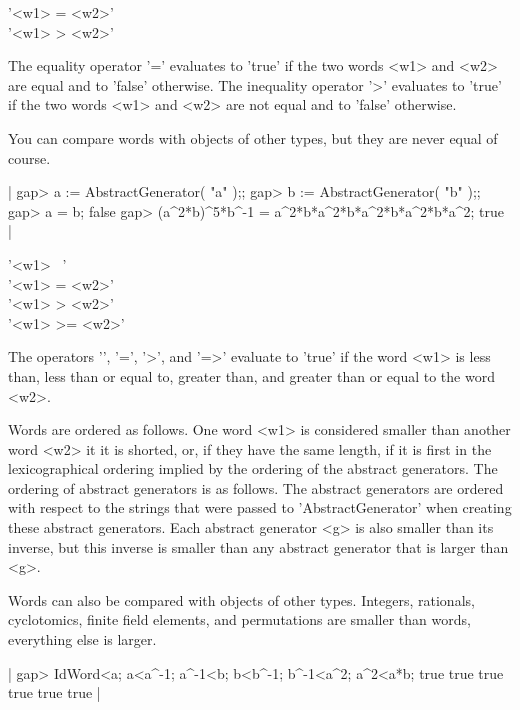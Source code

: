
'<w1> = <w2>'\\
'<w1> \<> <w2>'

The equality operator '=' evaluates to 'true' if the  two words  <w1> and
<w2> are equal and  to  'false' otherwise.  The inequality operator '\<>'
evaluates to 'true'  if the two words <w1> and <w2> are not  equal and to
'false' otherwise.

You  can  compare words  with objects of  other types, but they are never
equal of course.

|    gap> a := AbstractGenerator( "a" );;
    gap> b := AbstractGenerator( "b" );;
    gap> a = b;
    false
    gap> (a^2*b)^5*b^-1 = a^2*b*a^2*b*a^2*b*a^2*b*a^2;
    true |

'<w1> \<\ <w2>' \\
'<w1> \<= <w2>' \\
'<w1>  >  <w2>' \\
'<w1>  >= <w2>'

The operators '\<', '\<=', '>', and  '=>' evaluate to 'true'  if the word
<w1> is less than, less than or equal to, greater than, and greater  than
or equal to the word <w2>.

Words are  ordered as follows.   One word <w1> is considered smaller than
another word <w2> it it is shorted, or, if they have the same  length, if
it is first in  the lexicographical ordering  implied by  the ordering of
the  abstract  generators.  The ordering  of abstract  generators  is  as
follows.  The abstract generators are ordered with respect to the strings
that  were  passed to  'AbstractGenerator'  when  creating these abstract
generators.   Each abstract  generator  <g>  is  also  smaller  than  its
inverse, but this inverse is smaller than any abstract  generator that is
larger than <g>.

Words  can  also  be  compared with objects  of  other types.   Integers,
rationals,  cyclotomics,  finite field  elements,  and  permutations  are
smaller than words, everything else is larger.

|    gap> IdWord<a;  a<a^-1;  a^-1<b;  b<b^-1;  b^-1<a^2; a^2<a*b;
    true
    true
    true
    true
    true
    true |

%
%
%
%
%
%
%

